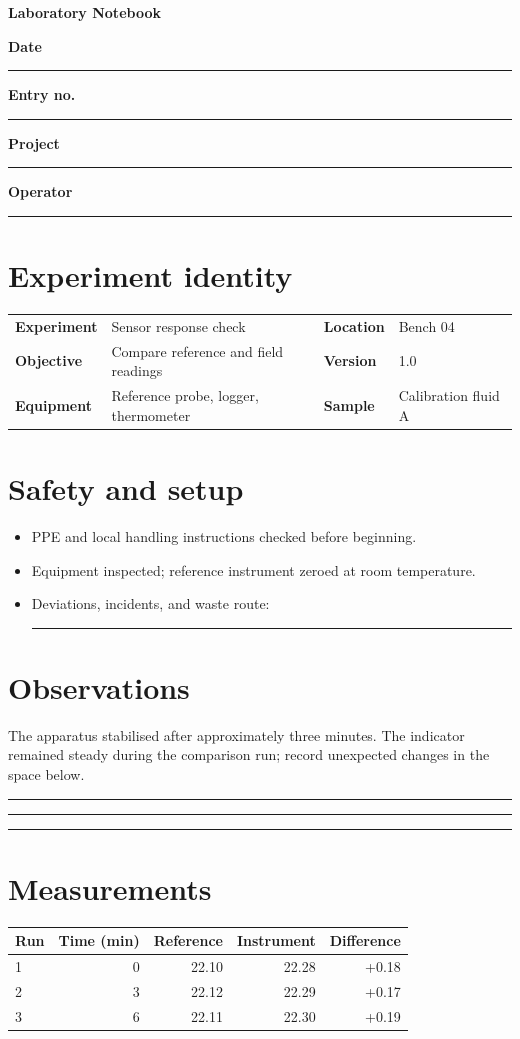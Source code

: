 \documentclass[11pt,a4paper]{article}
\newcommand{\linefield}[2]{\textbf{#1}\ \rule{#2}{.4pt}}
\begin{document}
\begin{center}
  {\color{labgreen}\LARGE\bfseries Laboratory Notebook}\par
  \par
\end{center}
\noindent\linefield{Date}{35mm}\hfill\linefield{Entry no.}{18mm}\par\smallskip
\noindent\linefield{Project}{63mm}\hfill\linefield{Operator}{35mm}
\section*{Experiment identity}
\begin{tabularx}{\linewidth}{@{}>{\bfseries}lX>{\bfseries}lX@{}}
  Experiment & Sensor response check & Location & Bench 04\\
  Objective & Compare reference and field readings & Version & 1.0\\
  Equipment & Reference probe, logger, thermometer & Sample & Calibration fluid A
\end{tabularx}
\section*{Safety and setup}
\begin{itemize}[leftmargin=*,itemsep=1pt]
  \item PPE and local handling instructions checked before beginning.
  \item Equipment inspected; reference instrument zeroed at room temperature.
  \item Deviations, incidents, and waste route: \rule{75mm}{.4pt}
\end{itemize}
\section*{Observations}
The apparatus stabilised after approximately three minutes. The indicator
remained steady during the comparison run; record unexpected changes in the
space below.
\vspace{18mm}\hrule\vspace{8mm}\hrule\vspace{8mm}\hrule
\section*{Measurements}
\begin{tabular}{@{}lrrrr@{}}
\toprule
Run & Time (min) & Reference & Instrument & Difference\\\midrule
1 & 0 & 22.10 & 22.28 & +0.18\\
2 & 3 & 22.12 & 22.29 & +0.17\\
3 & 6 & 22.11 & 22.30 & +0.19\\
\bottomrule
\end{tabular}
\end{document}
